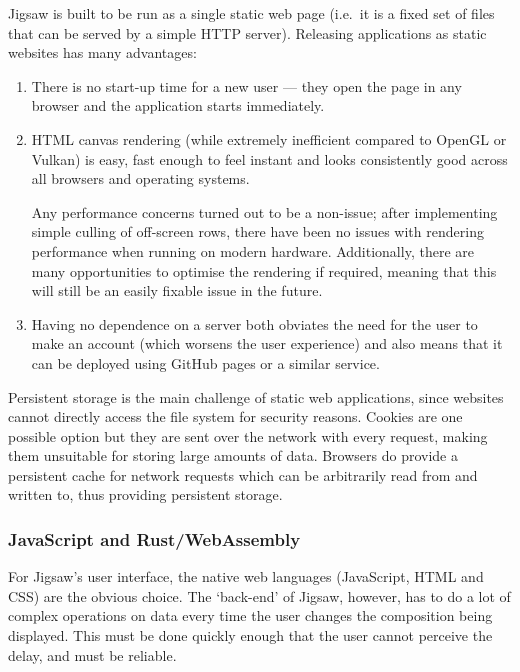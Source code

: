 \documentclass[12pt]{article}
\begin{document}
Jigsaw is built to be run as a single static web page (i.e.\ it is a fixed set of files that can be
served by a simple HTTP server).  Releasing applications as static websites has many advantages:

\begin{enumerate}
    \item There is no start-up time for a new user --- they open the page in any browser and the
        application starts immediately.
    \item HTML canvas rendering (while extremely inefficient compared to OpenGL or Vulkan) is easy,
        fast enough to feel instant and looks consistently good across all browsers and operating
        systems.

        Any performance concerns turned out to be a non-issue; after implementing simple culling
        of off-screen rows, there have been no issues with rendering performance when running on
        modern hardware.  Additionally, there are many opportunities to optimise the rendering if
        required, meaning that this will still be an easily fixable issue in the future.
    \item Having no dependence on a server both obviates the need for the user to make an account
        (which worsens the user experience) and also means that it can be deployed using GitHub
        pages or a similar service.
\end{enumerate}

Persistent storage is the main challenge of static web applications, since websites cannot directly access
the file system for security reasons.  Cookies are one possible option but they are sent over the
network with every request, making them unsuitable for storing large amounts of data.  Browsers do
provide a persistent cache for network requests which can be arbitrarily read from and written to,
thus providing persistent storage.

\subsubsection{JavaScript and Rust/WebAssembly}

For Jigsaw's user interface, the native web languages (JavaScript, HTML and CSS) are the obvious
choice.  The `back-end' of Jigsaw, however, has to do a lot of complex operations on data every time
the user changes the composition being displayed.  This must be done quickly enough that the user
cannot perceive the delay, and must be reliable.
\end{document}

